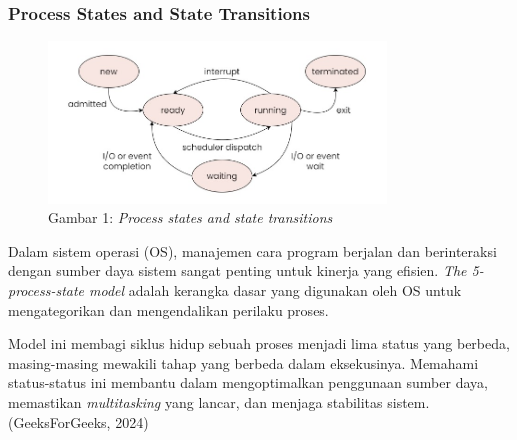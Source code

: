 \documentclass[12pt]{article}
\begin{document}
    \subsubsection{Process States and State Transitions}
        \begin{figure}[h]
            \centering
            \includegraphics[width=0.8\textwidth]{asset/process-state.jpg}
            \caption{Gambar 1: \textit{Process states and state transitions}}
            \label{fig:process_state}
        \end{figure}

        Dalam sistem operasi (OS), manajemen cara program berjalan dan
        berinteraksi dengan sumber daya sistem sangat penting untuk
        kinerja yang efisien. \textit{The 5-process-state model} adalah
        kerangka dasar yang digunakan oleh OS untuk mengategorikan
        dan mengendalikan perilaku proses.

        Model ini membagi siklus hidup sebuah proses menjadi lima status
        yang berbeda, masing-masing mewakili tahap yang berbeda dalam eksekusinya.
        Memahami status-status ini membantu dalam mengoptimalkan penggunaan sumber
        daya, memastikan \textit{multitasking} yang lancar, dan menjaga stabilitas
        sistem. (GeeksForGeeks, 2024)
\end{document}
